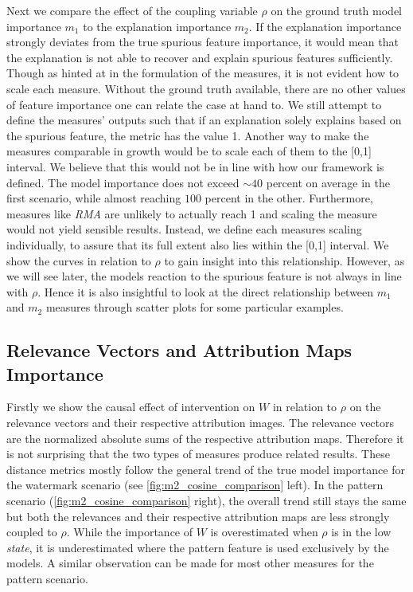 Next we compare the effect of the coupling variable $\rho$ on the ground truth model importance $m_1$ to the explanation importance $m_2$. 
If the explanation importance strongly deviates from the true spurious feature importance, it would mean that the explanation is not able to recover and explain spurious features sufficiently. Though as hinted at in the formulation of the measures, it is not evident how to scale each measure. Without the ground truth available, there are no other values of feature importance one can relate the case at hand to. We still attempt to define the measures' outputs such that if an explanation solely explains based on the spurious feature, the metric has the value 1. 
Another way to make the measures comparable in growth would be to scale each of them to the [0,1] interval. We believe that this would not be in line with how our framework is defined. The model importance does not exceed $\sim 40$ percent on average in the first scenario, while almost reaching $100$ percent in the other. Furthermore, measures like \textit{RMA} are unlikely to actually reach 1 and scaling the measure would not yield sensible results. Instead, we define each measures scaling individually, to assure that its full extent also lies within the [0,1] interval.
We show the curves in relation to $\rho$ to gain insight into this relationship. However, as we will see later, the models reaction to the spurious feature is not always in line with $\rho$. Hence it is also insightful to look at the direct relationship between $m_1$ and $m_2$ measures through scatter plots for some particular examples.

\subsection{Relevance Vectors and Attribution Maps Importance}
Firstly we show the causal effect of intervention on $W$ in relation to $\rho$ on the relevance vectors and their respective attribution images. 
The relevance vectors are the normalized absolute sums of the respective attribution maps. Therefore it is not surprising that the two types of measures produce related results.
These distance metrics mostly follow the general trend of the true model importance for the watermark scenario (see \cref{fig:m2_cosine_comparison} left). In the pattern scenario (\cref{fig:m2_cosine_comparison} right), the overall trend still stays the same but both the relevances and their respective attribution maps are less strongly coupled to $\rho$. While the importance of $W$ is overestimated when $\rho$ is in the low \textit{state}, it is underestimated where the pattern feature is used exclusively by the models. A similar observation can be made for most other measures for the pattern scenario. 


